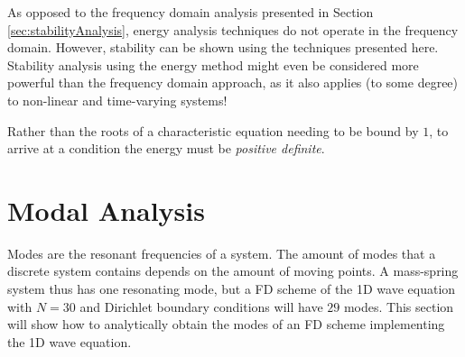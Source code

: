 {{As opposed to the frequency domain analysis presented in Section \ref{sec:stabilityAnalysis}, energy analysis techniques do not operate in the frequency domain. However, stability can be shown using the techniques presented here. Stability analysis using the energy method might even be considered more powerful than the frequency domain approach, as it also applies (to some degree) to non-linear and time-varying systems!

Rather than the roots of a characteristic equation needing to be bound by $1$, to arrive at a condition the energy must be \textit{positive definite}.



\section{Modal Analysis}
\label{sec:modalAnalysis}
Modes are the resonant frequencies of a system. The amount of modes that a discrete system contains depends on the amount of moving points. A mass-spring system thus has one resonating mode, but a FD scheme of the 1D wave equation with $N = 30$ and Dirichlet boundary conditions will have $29$ modes. This section will show how to analytically obtain the modes of an FD scheme implementing the 1D wave equation. 

}}
